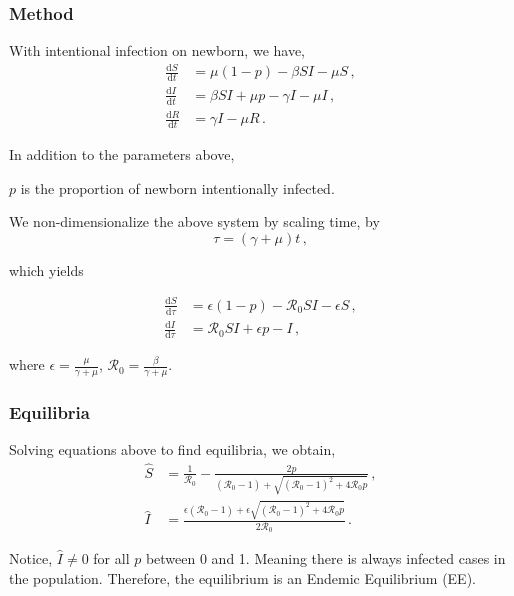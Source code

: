 \documentclass{beamer}
\newcommand\dbyd[2]{\frac{\mathrm d{#1}}{\mathrm d{#2}}}
\newcommand{\R}{\mathcal{R}}
\begin{document}
\begin{frame}
\frametitle{Method}
With intentional infection on newborn, we have,
\begin{equation}\label{2}
\begin{split}
\dbyd{S}{t}&=\mu(1-p)- \beta SI-\mu S \,,\\
\dbyd{I}{t}&=\beta SI+\mu p-\gamma I -\mu I\,,\\
\dbyd{R}{t}&=\gamma I-\mu R\,.
\end{split}
\end{equation}

In addition to the parameters above,

$p$ is the proportion of newborn intentionally infected.
\end{frame}
\begin{frame}
We non-dimensionalize the above system by scaling time, by
\begin{equation}
\tau=(\gamma+\mu)t \,,
\end{equation}

which yields

\begin{subequations}\label{3}
\begin{align}
\dbyd{S}{\tau}&=\epsilon(1-p)- \R_0  SI-\epsilon S \,,\\
\dbyd{I}{\tau}&=\R_0 SI+\epsilon p-I \,,
\end{align}
\end{subequations}

where $\epsilon=\frac{\mu}{\gamma+\mu}$, $\R_0=\frac{\beta}{\gamma+\mu}$.
\end{frame}
\begin{frame}
\frametitle{Equilibria}
Solving equations above to find equilibria, we obtain,
\begin{subequations}
\begin{align}
\hat{S} &=\frac{1}{\R_0}-\frac{2p}{(\R_0 -1)+ \sqrt{(\R_0-1)^2+4\R_0 p}}\,, \label{Shat1}\\
\hat{I} &= \frac{\epsilon(\R_0 -1)+ \epsilon \sqrt{(\R_0-1)^2+4\R_0
    p}}{2\R_0}\,.\label{Ihat1}
\end{align}
\end{subequations}

Notice, $\hat{I}\neq 0$ for all $p$ between 0 and 1. Meaning there is always infected cases in the population. Therefore, the equilibrium is an Endemic Equilibrium (EE).
\end{frame}
\end{document}
